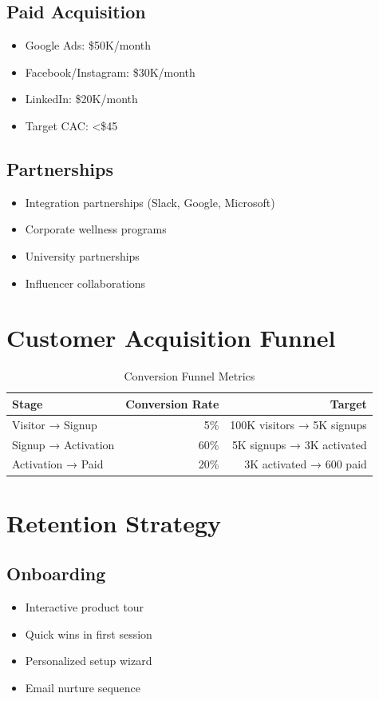 \subsection{Paid Acquisition}
\begin{itemize}
    \item Google Ads: \$50K/month
    \item Facebook/Instagram: \$30K/month
    \item LinkedIn: \$20K/month
    \item Target CAC: <\$45
\end{itemize}

\subsection{Partnerships}
\begin{itemize}
    \item Integration partnerships (Slack, Google, Microsoft)
    \item Corporate wellness programs
    \item University partnerships
    \item Influencer collaborations
\end{itemize}

\section{Customer Acquisition Funnel}

\begin{table}[H]
\centering
\caption{Conversion Funnel Metrics}
\begin{tabular}{|l|r|r|}
\hline
\rowcolor{lightgray}
\textbf{Stage} & \textbf{Conversion Rate} & \textbf{Target} \\
\hline
Visitor → Signup & 5\% & 100K visitors → 5K signups \\
\hline
Signup → Activation & 60\% & 5K signups → 3K activated \\
\hline
Activation → Paid & 20\% & 3K activated → 600 paid \\
\hline
\end{tabular}
\end{table}

\section{Retention Strategy}

\subsection{Onboarding}
\begin{itemize}
    \item Interactive product tour
    \item Quick wins in first session
    \item Personalized setup wizard
    \item Email nurture sequence
\end{itemize}

